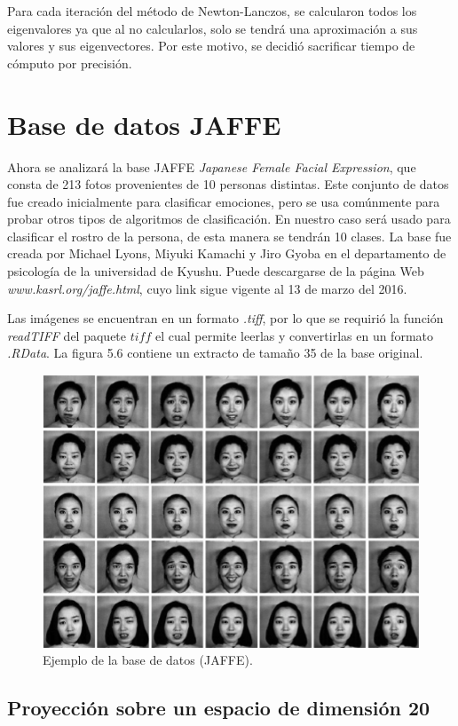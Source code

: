 Para cada iteración del método de Newton-Lanczos, se calcularon todos los eigenvalores ya que al no calcularlos, solo se tendrá una aproximación a sus valores y sus eigenvectores. Por este motivo, se decidió sacrificar tiempo de cómputo por precisión.

\section{Base de datos JAFFE}


Ahora se analizará la base JAFFE \textit{Japanese Female Facial Expression}, que consta de 213 fotos provenientes de 10 personas distintas. Este conjunto de datos fue creado inicialmente para clasificar emociones, pero se usa comúnmente para probar otros tipos de algoritmos de clasificación. En nuestro caso será usado para clasificar el rostro de la persona, de esta manera se tendrán 10 clases. La base fue creada por Michael Lyons, Miyuki Kamachi y Jiro Gyoba en el departamento de psicología de la universidad de Kyushu. Puede descargarse de la página Web \textit{www.kasrl.org/jaffe.html}, cuyo link sigue vigente al 13 de marzo del 2016.

Las imágenes se encuentran en un formato \textit{.tiff}, por lo que se requirió la función \textit{readTIFF} del paquete $tiff$ el cual permite leerlas y convertirlas en un formato \textit{.RData}. La figura 5.6 contiene un extracto de tamaño 35 de la base original.

\pagebreak

\begin{figure}[!ht]
  \centering
  \includegraphics[width=.8\textwidth]{Figures/Chapter4_Jaffe.png} 
  \caption{Ejemplo de la base de datos (JAFFE).}
\end{figure}

\subsection{Proyección sobre un espacio de dimensión 20}

